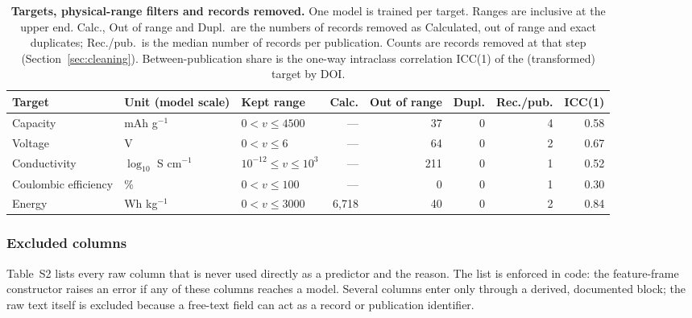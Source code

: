 \documentclass[journal=jcisd8,manuscript=article,layout=traditional]{achemso}
\begin{document}
\begin{table}[htbp]
    \centering\small
    \caption{\textbf{Targets, physical-range filters and records removed.} One model is trained per target. Ranges are inclusive at the upper end. Calc., Out of range and Dupl.\ are the numbers of records removed as Calculated, out of range and exact duplicates; Rec./pub.\ is the median number of records per publication. Counts are records removed at that step (Section~\ref{sec:cleaning}). Between-publication share is the one-way intraclass correlation ICC(1) of the (transformed) target by DOI.}
    \label{tab:targets}
    \setlength{\tabcolsep}{4pt}\footnotesize
    \begin{adjustbox}{max width=\textwidth}
    \begin{tabular}{@{}lllrrrrr@{}}
        \toprule
        Target & Unit (model scale) & Kept range & Calc. & Out of range & Dupl. & Rec./pub. & ICC(1) \\
        \midrule
        Capacity              & mAh g$^{-1}$ & $0 < v \le 4500$ & --- & 37 & 0 & 4 & 0.58 \\
        Voltage               & V & $0 < v \le 6$    & --- & 64 & 0 & 2 & 0.67 \\
        Conductivity          & $\log_{10}$ S cm$^{-1}$ & $10^{-12} \le v \le 10^{3}$ & --- & 211 & 0 & 1 & 0.52 \\
        Coulombic efficiency  & \% & $0 < v \le 100$  & --- & 0 & 0 & 1 & 0.30 \\
        Energy                & Wh kg$^{-1}$ & $0 < v \le 3000$ & 6,718 & 40 & 0 & 2 & 0.84 \\
        \bottomrule
    \end{tabular}
    \end{adjustbox}
\end{table}

\subsubsection{Excluded columns}
\label{sec:forbidden}

Table~S2 lists every raw column that is never used directly as a predictor and the reason. The list is enforced in code: the feature-frame constructor raises an error if any of these columns reaches a model. Several columns enter only through a derived, documented block; the raw text itself is excluded because a free-text field can act as a record or publication identifier.
\end{document}
